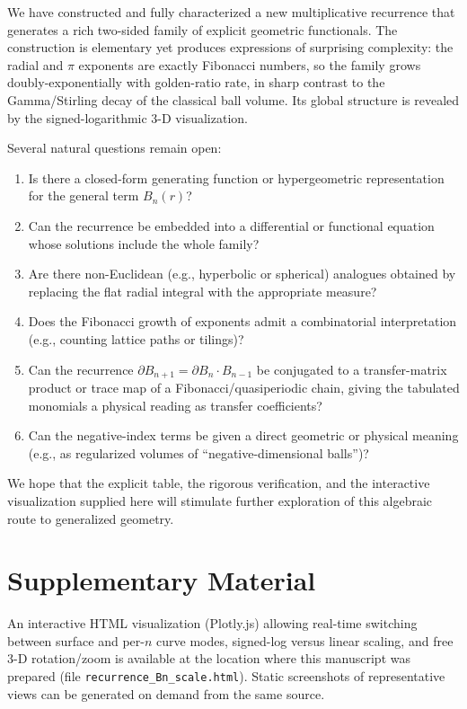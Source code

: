 \documentclass[11pt,a4paper]{article}
\theoremstyle{definition}
\begin{document}
We have constructed and fully characterized a new multiplicative recurrence that generates a rich two-sided family of explicit geometric functionals. The construction is elementary yet produces expressions of surprising complexity: the radial and \(\pi\) exponents are exactly Fibonacci numbers, so the family grows doubly-exponentially with golden-ratio rate, in sharp contrast to the Gamma/Stirling decay of the classical ball volume. Its global structure is revealed by the signed-logarithmic 3-D visualization.

Several natural questions remain open:
\begin{enumerate}
\item Is there a closed-form generating function or hypergeometric representation for the general term \(B_n(r)\)?
\item Can the recurrence be embedded into a differential or functional equation whose solutions include the whole family?
\item Are there non-Euclidean (e.g., hyperbolic or spherical) analogues obtained by replacing the flat radial integral with the appropriate measure?
\item Does the Fibonacci growth of exponents admit a combinatorial interpretation (e.g., counting lattice paths or tilings)?
\item Can the recurrence \(\partial B_{n+1}=\partial B_n\cdot B_{n-1}\) be conjugated to a transfer-matrix product or trace map of a Fibonacci/quasiperiodic chain, giving the tabulated monomials a physical reading as transfer coefficients?
\item Can the negative-index terms be given a direct geometric or physical meaning (e.g., as regularized volumes of ``negative-dimensional balls'')?
\end{enumerate}

We hope that the explicit table, the rigorous verification, and the interactive visualization supplied here will stimulate further exploration of this algebraic route to generalized geometry.

\section*{Supplementary Material}

An interactive HTML visualization (Plotly.js) allowing real-time switching between surface and per-\(n\) curve modes, signed-log versus linear scaling, and free 3-D rotation/zoom is available at the location where this manuscript was prepared (file \texttt{recurrence\_Bn\_scale.html}). Static screenshots of representative views can be generated on demand from the same source.
\end{document}
